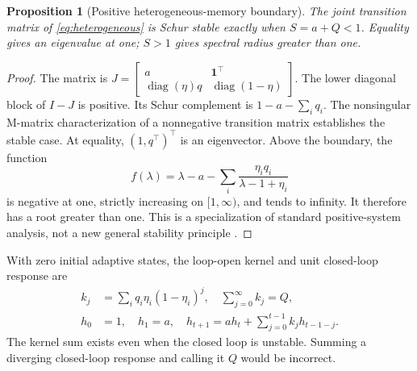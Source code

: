 \documentclass[10pt,twocolumn,letterpaper]{article}
\newtheorem{proposition}[theorem]{Proposition}
\theoremstyle{definition}
\theoremstyle{remark}
\begin{document}
\begin{proposition}[Positive heterogeneous-memory boundary]
\label{prop:heterogeneous_boundary}
The joint transition matrix of \eqref{eq:heterogeneous} is Schur stable exactly when $S=a+Q<1$. Equality gives an eigenvalue at one; $S>1$ gives spectral radius greater than one.
\end{proposition}
\begin{proof}
The matrix is $J=\left[\begin{smallmatrix}a&\mathbf1^\top\\\operatorname{diag}(\eta)q&\operatorname{diag}(1-\eta)\end{smallmatrix}\right]$. The lower diagonal block of $I-J$ is positive. Its Schur complement is $1-a-\sum_iq_i$. The nonsingular M-matrix characterization of a nonnegative transition matrix establishes the stable case. At equality, $(1,q^\top)^\top$ is an eigenvector. Above the boundary, the function
\[
 f(\lambda)=\lambda-a-\sum_i\frac{\eta_iq_i}{\lambda-1+\eta_i}
\]
is negative at one, strictly increasing on $[1,\infty)$, and tends to infinity. It therefore has a root greater than one. This is a specialization of standard positive-system analysis, not a new general stability principle \citep{rantzer2015}.
\end{proof}

With zero initial adaptive states, the loop-open kernel and unit closed-loop response are
\begin{align}
 k_j&=\sum_iq_i\eta_i(1-\eta_i)^j,\quad \sum_{j=0}^{\infty}k_j=Q,\label{eq:integrated_kernel}\\
 h_0&=1,\quad h_1=a,\quad
 h_{t+1}=a h_t+\sum_{j=0}^{t-1}k_jh_{t-1-j}.\label{eq:integrated_h}
\end{align}
The kernel sum exists even when the closed loop is unstable. Summing a diverging closed-loop response and calling it $Q$ would be incorrect.
\end{document}

